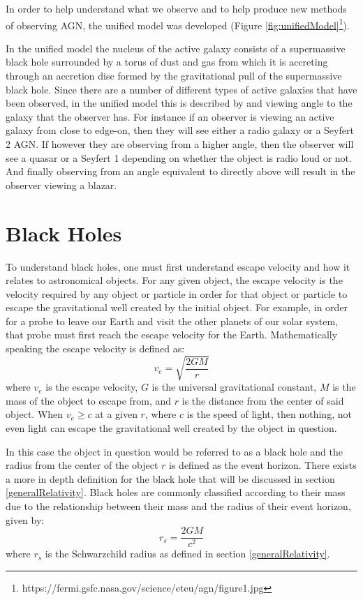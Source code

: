 \documentclass[12pt, oneside]{smuthesis}
\begin{document}
In order to help understand what we observe and to help produce new methods of observing AGN, the unified model was developed (Figure \ref{fig:unifiedModel}\footnote{https://fermi.gsfc.nasa.gov/science/eteu/agn/figure1.jpg}). 

In the unified model the nucleus of the active galaxy consists of a supermassive black hole surrounded by a torus of dust and gas from which it is accreting through an accretion disc formed by the gravitational pull of the supermassive black hole. Since there are a number of different types of active galaxies that have been observed, in the unified model this is described by and viewing angle to the galaxy that the observer has. For instance if an observer is viewing an active galaxy from close to edge-on, then they will see either a radio galaxy or a Seyfert 2 AGN. If however they are observing from a higher angle, then the observer will see a quasar or a Seyfert 1 depending on whether the object is radio loud or not. And finally observing from an angle equivalent to directly above will result in the observer viewing a blazar.

\section{\sc Black Holes} \label{blackHole}

To understand black holes, one must first understand escape velocity and how it relates to astronomical objects. For any given object, the escape velocity is the velocity required by any object or particle in order for that object or particle to escape the gravitational well created by the initial object. For example, in order for a probe to leave our Earth and visit the other planets of our solar system, that probe must first reach the escape velocity for the Earth. Mathematically speaking the escape velocity is defined as:
\begin{equation} \label{eqn1.1}
v_{e} = \sqrt{\frac{2GM}{r}}
\end{equation}
where $v_{e}$ is the escape velocity, $G$ is the universal gravitational constant, $M$ is the mass of the object to escape from, and $r$ is the distance from the center of said object. When $v_{e} \geq c$ at a given $r$, where $c$ is the speed of light, then nothing, not even light can escape the gravitational well created by the object in question.

In this case the object in question would be referred to as a black hole and the radius from the center of the object $r$ is defined as the event horizon. There exists a more in depth definition for the black hole that will be discussed in section \ref{generalRelativity}. Black holes are commonly classified according to their mass due to the relationship between their mass and the radius of their event horizon, given by:
\begin{equation} \label{eqn1.2}
r_{s} = \frac{2GM}{c^{2}}
\end{equation}
where $r_{s}$ is the Schwarzchild radius as defined in section \ref{generalRelativity}.
\end{document}
